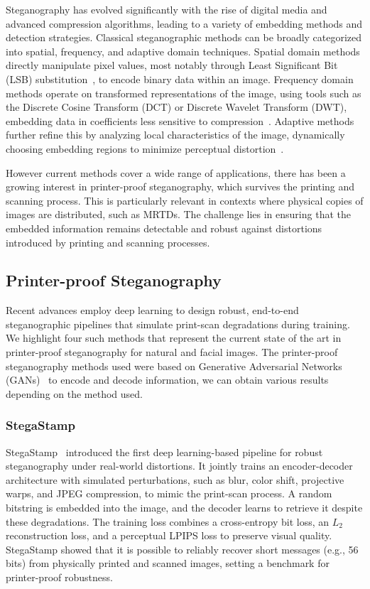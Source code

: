 Steganography has evolved significantly with the rise of digital media and advanced compression algorithms, leading to a variety of embedding methods and detection strategies. Classical steganographic methods can be broadly categorized into spatial, frequency, and adaptive domain techniques. Spatial domain methods directly manipulate pixel values, most notably through Least Significant Bit (LSB) substitution~\cite{steganography2017}, to encode binary data within an image. Frequency domain methods operate on transformed representations of the image, using tools such as the Discrete Cosine Transform (DCT) or Discrete Wavelet Transform (DWT), embedding data in coefficients less sensitive to compression~\cite{steganography2016survey}. Adaptive methods further refine this by analyzing local characteristics of the image, dynamically choosing embedding regions to minimize perceptual distortion~\cite{steganography2018adaptive}.

However current methods cover a wide range of applications, there has been a growing interest in printer-proof steganography, which survives the printing and scanning process. This is particularly relevant in contexts where physical copies of images are distributed, such as MRTDs. The challenge lies in ensuring that the embedded information remains detectable and robust against distortions introduced by printing and scanning processes.

\subsection{Printer-proof Steganography}
Recent advances employ deep learning to design robust, end-to-end steganographic pipelines that simulate print-scan degradations during training. We highlight four such methods that represent the current state of the art in printer-proof steganography for natural and facial images. The printer-proof steganography methods used were based on Generative Adversarial Networks (GANs)~\cite{gans2018} to encode and decode information, we can obtain various results depending on the method used.

\subsubsection{StegaStamp}
StegaStamp~\cite{stegastamp2020} introduced the first deep learning-based pipeline for robust steganography under real-world distortions. It jointly trains an encoder-decoder architecture with simulated perturbations, such as blur, color shift, projective warps, and JPEG compression, to mimic the print-scan process. A random bitstring is embedded into the image, and the decoder learns to retrieve it despite these degradations. The training loss combines a cross-entropy bit loss, an $L_2$ reconstruction loss, and a perceptual LPIPS loss to preserve visual quality. StegaStamp showed that it is possible to reliably recover short messages (e.g., 56 bits) from physically printed and scanned images, setting a benchmark for printer-proof robustness.

